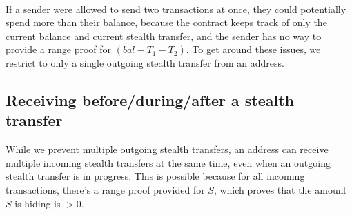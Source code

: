 \documentclass{article}
\begin{document}
\paragraph{}
If a sender were allowed to send two transactions at once, they could potentially spend more than their balance, because the contract keeps track of only the current balance and current stealth transfer, and the sender has no way to provide a range proof for $(bal - T_1 - T_2)$. To get around these issues, we restrict to only a single outgoing stealth transfer from an address.
\subsection{Receiving before/during/after a stealth transfer}
While we prevent multiple outgoing stealth transfers, an address can receive multiple incoming stealth transfers at the same time, even when an outgoing stealth transfer is in progress. This is possible because for all incoming transactions, there's a range proof provided for $S$, which proves that the amount $S$ is hiding is $>0$.
\end{document}
